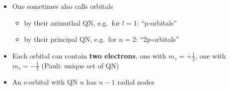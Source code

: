 \begin{itemize}
    \item One sometimes also calls orbitals
          \begin{itemize}
              \item by their azimuthal QN, e.g.\ for $l=1$: ``p-orbitals''
              \item by their principal QN, e.g.\ for $n=2$: ``2p-orbitals''
          \end{itemize}
    \item Each orbital can contain \textbf{two electrons}, one with $m_s=+\frac{1}{2}$, one with $m_s=-\frac{1}{2}$ (Pauli: unique set of QN)
    \item An s-orbital with QN $n$ has $n-1$ radial nodes
\end{itemize}

